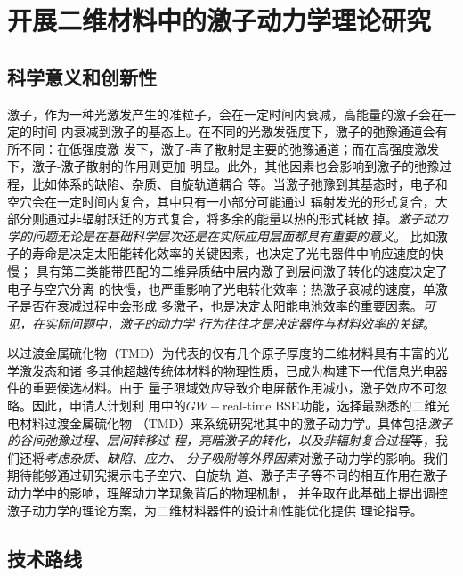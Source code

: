 \setcounter{section}{0}

\section{开展二维材料中的激子动力学理论研究}

\subsection{科学意义和创新性}

激子，作为一种光激发产生的准粒子，会在一定时间内衰减，高能量的激子会在一定的时间
内衰减到激子的基态上。在不同的光激发强度下，激子的弛豫通道会有所不同：在低强度激
发下，激子-声子散射是主要的弛豫通道；而在高强度激发下，激子-激子散射的作用则更加
明显。此外，其他因素也会影响到激子的弛豫过程，比如体系的缺陷、杂质、自旋轨道耦合
等。当激子弛豫到其基态时，电子和空穴会在一定时间内复合，其中只有一小部分可能通过
辐射发光的形式复合，大部分则通过非辐射跃迁的方式复合，将多余的能量以热的形式耗散
掉。\emph{激子动力学的问题无论是在基础科学层次还是在实际应用层面都具有重要的意义}。
比如激子的寿命是决定太阳能转化效率的关键因素，也决定了光电器件中响应速度的快慢；
具有第二类能带匹配的二维异质结中层内激子到层间激子转化的速度决定了电子与空穴分离
的快慢，也严重影响了光电转化效率；热激子衰减的速度，单激子是否在衰减过程中会形成
多激子，也是决定太阳能电池效率的重要因素。\emph{可见，在实际问题中，激子的动力学
  行为往往才是决定器件与材料效率的关键}。

以过渡金属硫化物（TMD）为代表的仅有几个原子厚度的二维材料具有丰富的光学激发态和诸
多其他超越传统体材料的物理性质，已成为构建下一代信息光电器件的重要候选材料。由于
量子限域效应导致介电屏蔽作用减小，激子效应不可忽略。因此，申请人计划利
用\hnamd{}中的$GW{}+{}$real-time BSE功能，选择最熟悉的二维光电材料过渡金属硫化物
（TMD）来系统研究地其中的激子动力学。具体包括\emph{激子的谷间弛豫过程、层间转移过
  程，亮暗激子的转化，以及非辐射复合过程}等，我们还将\emph{考虑杂质、缺陷、应力、
  分子吸附等外界因素}对激子动力学的影响。我们期待能够通过研究揭示电子空穴、自旋轨
道、激子声子等不同的相互作用在激子动力学中的影响，理解动力学现象背后的物理机制，
并争取在此基础上提出调控激子动力学的理论方案，为二维材料器件的设计和性能优化提供
理论指导。

\subsection{技术路线}

